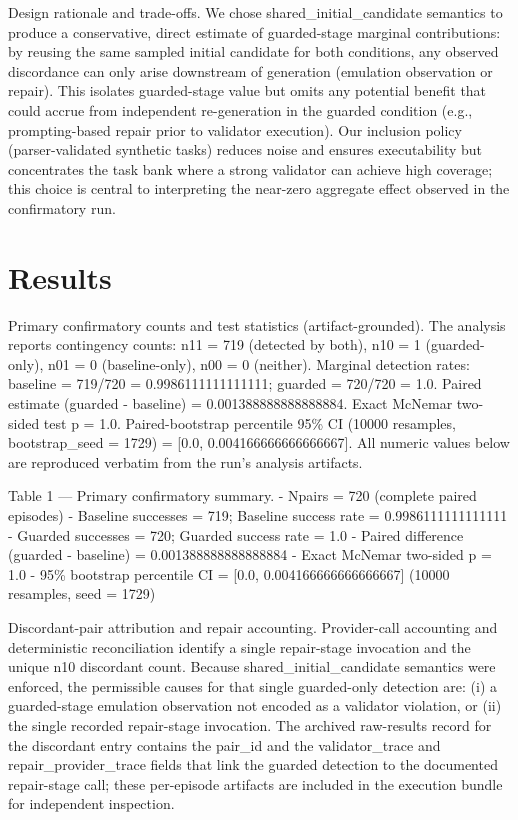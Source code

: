 \documentclass[conference]{IEEEtran}
\begin{document}
Design rationale and trade-offs. We chose shared\_initial\_candidate semantics to produce a conservative, direct estimate of guarded-stage marginal contributions: by reusing the same sampled initial candidate for both conditions, any observed discordance can only arise downstream of generation (emulation observation or repair). This isolates guarded-stage value but omits any potential benefit that could accrue from independent re-generation in the guarded condition (e.g., prompting-based repair prior to validator execution). Our inclusion policy (parser-validated synthetic tasks) reduces noise and ensures executability but concentrates the task bank where a strong validator can achieve high coverage; this choice is central to interpreting the near-zero aggregate effect observed in the confirmatory run.

\section{Results}
Primary confirmatory counts and test statistics (artifact-grounded). The analysis reports contingency counts: n11 = 719 (detected by both), n10 = 1 (guarded-only), n01 = 0 (baseline-only), n00 = 0 (neither). Marginal detection rates: baseline = 719/720 = 0.9986111111111111; guarded = 720/720 = 1.0. Paired estimate (guarded - baseline) = 0.001388888888888884. Exact McNemar two-sided test p = 1.0. Paired-bootstrap percentile 95\% CI (10000 resamples, bootstrap\_seed = 1729) = [0.0, 0.004166666666666667]. All numeric values below are reproduced verbatim from the run's analysis artifacts.

Table 1 --- Primary confirmatory summary.
- Npairs = 720 (complete paired episodes)
- Baseline successes = 719; Baseline success rate = 0.9986111111111111
- Guarded successes = 720; Guarded success rate = 1.0
- Paired difference (guarded - baseline) = 0.001388888888888884
- Exact McNemar two-sided p = 1.0
- 95\% bootstrap percentile CI = [0.0, 0.004166666666666667] (10000 resamples, seed = 1729)

Discordant-pair attribution and repair accounting. Provider-call accounting and deterministic reconciliation identify a single repair-stage invocation and the unique n10 discordant count. Because shared\_initial\_candidate semantics were enforced, the permissible causes for that single guarded-only detection are: (i) a guarded-stage emulation observation not encoded as a validator violation, or (ii) the single recorded repair-stage invocation. The archived raw-results record for the discordant entry contains the pair\_id and the validator\_trace and repair\_provider\_trace fields that link the guarded detection to the documented repair-stage call; these per-episode artifacts are included in the execution bundle for independent inspection.
\end{document}

